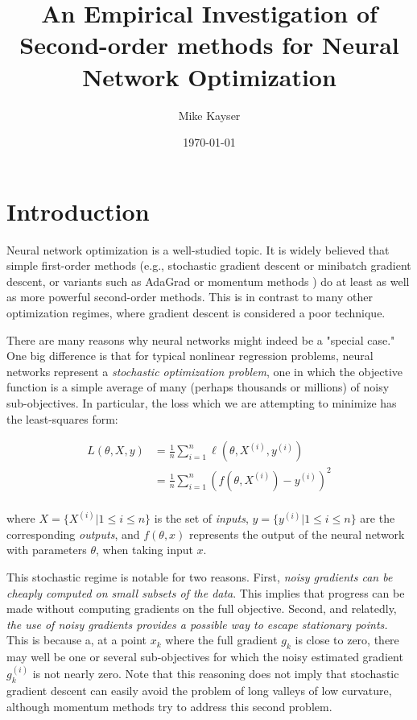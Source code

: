 \documentclass[11pt]{article}
\title{An Empirical Investigation of Second-order methods for Neural Network Optimization}
\author{Mike Kayser}
\date{\today}
\begin{document}
\maketitle

\section{Introduction}

\begin{comment}
this section introduces your problem, and the overall plan for approaching your problem
\end{comment}

Neural network optimization is a well-studied topic. It is widely believed that simple first-order methods (e.g., stochastic gradient descent or minibatch gradient descent, or variants such as AdaGrad \cite{adagrad} or momentum methods \cite{momentum}) do at least as well as more powerful second-order methods. This is in contrast to many other optimization regimes, where gradient descent is considered a poor technique.

There are many reasons why neural networks might indeed be a "special case." One big difference is that for typical nonlinear regression problems, neural networks represent a \textit{stochastic optimization problem}, one in which the objective function is a simple average of many (perhaps thousands or millions) of noisy sub-objectives. In particular, the loss which we are attempting to minimize has the least-squares form:

\begin{align*}
  L(\theta, X, y) &= \frac{1}{n} \sum_{i=1}^{n} \ell(\theta, X^{(i)}, y^{(i)}) \\
                  &= \frac{1}{n} \sum_{i=1}^{n} (f(\theta, X^{(i)}) - y^{(i)})^2 \\
\end{align*}

where $X = \{X^{(i)} | 1 \leq i \leq n \}$ is the set of \textit{inputs}, $y = \{y^{(i)} | 1 \leq i \leq n \}$ are the corresponding \textit{outputs}, and $f(\theta,x)$ represents the output of the neural network with parameters $\theta$, when taking input $x$.

This stochastic regime is notable for two reasons. First, \textit{noisy gradients can be cheaply computed on small subsets of the data}. This implies that progress can be made without computing gradients on the full objective. Second, and relatedly, \textit{the use of noisy gradients provides a possible way to escape stationary points.} This is because a, at a point $x_k$ where the full gradient $g_k$ is close to zero, there may well be one or several sub-objectives for which the noisy estimated gradient $g_k^{(i)}$ is not nearly zero. Note that this reasoning does not imply that stochastic gradient descent can easily avoid the problem of long valleys of low curvature, although momentum methods try to address this second problem.
\end{document}
